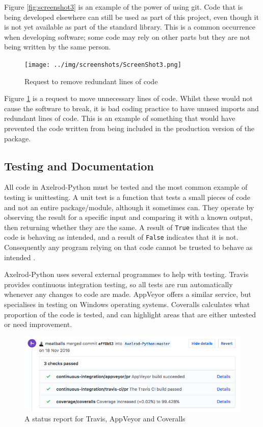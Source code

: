 Figure \ref{fig:screenshot3} is an example of the power of using git.
Code that is being developed elsewhere can still be used as part of this project, even though it is not yet available as part of the standard library.
This is a common occurrence when developing software; some code may rely on other parts but they are not being written by the same person.

\begin{figure}[htbp!]
\texttt{[image: ../img/screenshots/ScreenShot3.png]}
\caption{Request to remove redundant lines of code}
\label{fig:screenshot4}
\end{figure}

Figure \ref{fig:screenshot4} is a request to move unnecessary lines of code.
Whilst these would not cause the software to break, it is bad coding practice to have unused imports and redundant lines of code.
This is an example of something that would have prevented the code written from being included in the production version of the package.

\subsection{Testing and Documentation}
All code in Axelrod-Python must be tested and the most common example of testing is unittesting.
A unit test is a function that tests a small pieces of code and not an entire package/module, although it sometimes can.
They operate by observing the result for a specific input and comparing it with a known output, then returning whether they are the same.
A result of \texttt{True} indicates that the code is behaving as intended, and a result of \texttt{False} indicates that it is not.
Consequently any program relying on that code cannot be trusted to behave as intended \cite{Sarma2016, Williams}.

Axelrod-Python uses several external programmes to help with testing.
Travis \cite{Travis} provides continuous integration testing, so all tests are run automatically whenever any changes to code are made.
AppVeyor \cite{AppVeyor} offers a similar service, but specialises in testing on Windows operating systems.
Coveralls \cite{Coveralls} calculates what proportion of the code is tested, and can highlight areas that are either untested or need improvement.

\begin{figure}[htbp!]
\includegraphics[width = \textwidth]{../img/screenshots/ScreenShot5.png}
\caption{A status report for Travis, AppVeyor and Coveralls}
\label{fig:screenshot5}
\end{figure}

